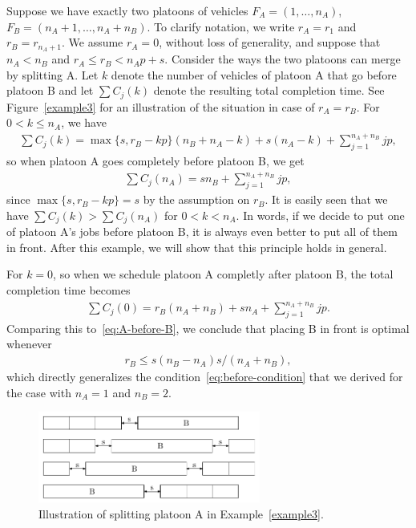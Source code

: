 \documentclass{article}
\theoremstyle{definition}
\theoremstyle{plain}
\begin{document}
\begin{eg}
  \label{example3}
  Suppose we have exactly two platoons of vehicles $F_{A} = (1, \dots, n_{A})$,
  $F_{B} = (n_{A} + 1, \dots, n_{A} + n_{B})$. To clarify notation, we write
  $r_{A} = r_{1}$ and $r_{B} = r_{n_{A} + 1}$. We assume $r_{A} = 0$, without
  loss of generality, and suppose that $n_{A} < n_{B}$ and
  $r_{A} \leq r_{B} < n_{A}p + s$. Consider the ways the two platoons can merge
  by splitting A. Let $k$ denote the number of vehicles of platoon A that go
  before platoon B and let $\sum C_{j}(k)$ denote the resulting total completion
  time. See Figure~\ref{example3} for an illustration of the situation in case of
  $r_{A} = r_{B}$. For $0 < k \leq n_{A}$, we have
  \begin{align*}
    \sum C_{j} (k) = \max\{ s, r_{B} - kp\} (n_{B} + n_{A} - k) + s (n_{A} - k) + \sum_{j=1}^{n_{A}+n_{B}} jp ,
  \end{align*}
  so when platoon A goes completely before platoon B, we get
  \begin{align}
    \sum C_{j} (n_{A}) = s n_{B} + \sum_{j=1}^{n_{A}+n_{B}} jp ,
    \label{eq:A-before-B}
  \end{align}
  since $\max\{ s, r_{B} - kp \} = s$ by the assumption on $r_{B}$. It is easily
  seen that we have $\sum C_{j}(k) > \sum C_{j} (n_{A})$ for $0 < k < n_{A}$. In
  words, if we decide to put one of platoon A's jobs before platoon B, it is
  always even better to put all of them in front. After this example, we will
  show that this principle holds in general.

  For $k=0$, so when we schedule platoon A completly after platoon B, the total
  completion time becomes
  \begin{align*}
    \sum C_{j} (0) = r_{B} (n_{A} + n_{B}) + s n_{A} + \sum_{j=1}^{n_{A}+n_{B}} jp .
  \end{align*}
  Comparing this to~\eqref{eq:A-before-B}, we conclude that placing B in front
  is optimal whenever
  \begin{align*}
    r_{B} \leq s (n_{B} - n_{A}) s / (n_{A} + n_{B}) ,
  \end{align*}
  which directly generalizes the condition~\eqref{eq:before-condition} that we
  derived for the case with $n_{A} = 1$ and $n_{B} = 2$.
\end{eg}

\begin{figure}
  \centering
  \includegraphics[width=0.65\textwidth]{figures/platoons.pdf}
  \caption{Illustration of splitting platoon A in Example~\ref{example3}.}
  \label{fig:example3}
\end{figure}
\end{document}
